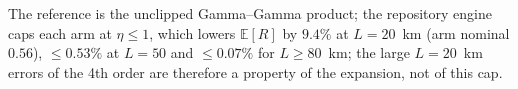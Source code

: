 \begin{table}[htbp]
\begin{tabular}{rcccccccccccc}
\bottomrule
\end{tabular}
\par\smallskip
\begin{minipage}{0.95\linewidth}\footnotesize The reference is the unclipped Gamma--Gamma product; the repository engine caps each arm at $\eta\le1$, which lowers $\mathbb E[R]$ by $9.4\%$ at $L=20$~km (arm nominal $0.56$), $\le0.53\%$ at $L=50$ and $\le0.07\%$ for $L\ge80$~km; the large $L=20$~km errors of the 4th order are therefore a property of the expansion, not of this cap.\end{minipage}
\end{table}
